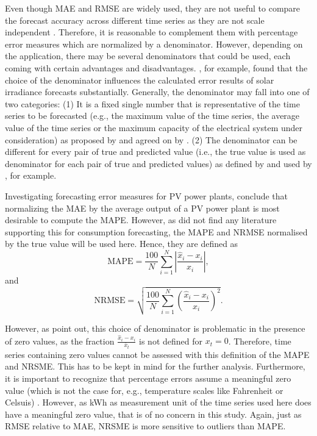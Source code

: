 Even though MAE and RMSE are widely used, they are not useful to compare the forecast accuracy across different time series as they are not scale independent \citep{Meer:2018}. Therefore, it is reasonable to complement them with percentage error measures which are normalized by a denominator. However, depending on the application, there may be several denominators that could be used, each coming with certain advantages and disadvantages. \citet{Hoff:2013}, for example, found that the choice of the denominator influences the calculated error results of solar irradiance forecasts substantially. Generally, the denominator may fall into one of two categories: (1) It is a fixed single number that is representative of the time series to be forecasted (e.g., the maximum value of the time series, the average value of the time series or the maximum capacity of the electrical system under consideration) as proposed by \citet{Hoff:2013} and agreed on by \citet{Meer:2018}. (2) The denominator can be different for every pair of true and predicted value (i.e., the true value is used as denominator for each pair of true and predicted values) as defined by \citet{Hyndman:2006} and used by \citet{xie:2018}, for example. 

Investigating forecasting error measures for PV power plants, \citet{Hoff:2013} conclude that normalizing the MAE by the average output of a PV power plant is most desirable to compute the MAPE. However, as \citet{Meer:2018} did not find any literature supporting this for consumption forecasting, the MAPE and NRMSE normalised by the true value will be used here. Hence, they are defined as
%
\begin{equation} \label{Eq:MAPE}
\text{MAPE}=\frac{100}{N}\sum_{i=1}^N\left|\frac{\widehat{x}_i-x_i}{x_i}\right|,
\end{equation}
and
\begin{equation} \label{Eq:NRMSE}
\text{NRMSE}=\sqrt{\frac{100}{N}\sum_{i=1}^N\left(\frac{\widehat{x}_i-x_i}{x_i}\right)^2}.
\end{equation}

\noindent However, as \citet{Hyndman:2006} point out, this choice of denominator is problematic in the presence of zero values, as the fraction $\frac{\widehat{x}_i-x_i}{\bar{x}_t}$ is not defined for $x_t=0$. Therefore, time series containing zero values cannot be assessed with this definition of the MAPE and NRSME. This has to be kept in mind for the further analysis. Furthermore, it is important to recognize that percentage errors assume a meaningful zero value (which is not the case for, e.g., temperature scales like Fahrenheit or Celsuis) \citep{Hyndman:2006}. However, as kWh as measurement unit of the time series used here does have a meaningful zero value, that is of no concern in this study. Again, just as RMSE relative to MAE, NRSME is more sensitive to outliers than MAPE.


